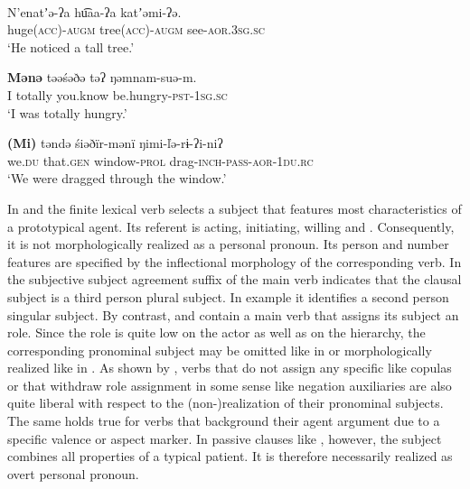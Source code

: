 \documentclass[output=paper]{LSP/langsci}
\begin{document}
\ea \label{12-wr-ex:5}
\\

\ea \label{12-wr-ex:5a}
\gll N’enatʼə-ʔa hu͡aa-ʔa katʼəmi-ʔə.\\
 huge\textsc{(acc)}-\textsc{augm} tree\textsc{(acc)}-\textsc{augm} see-\textsc{aor.3sg.sc}\\
\glt ‘He noticed a tall tree.’

\ex \label{12-wr-ex:5b}
\gll \textbf{Mənə} təəśəðə	təʔ               ŋəmnam-suə-m.\\
I         totally	you.know  be.hungry-\textsc{pst-1sg.sc}\\
\glt ‘I was totally hungry.’

\ex \label{12-wr-ex:5c}%
\gll *\textbf{(Mi)}   təndə       śiəðïr-mənï        ŋimi-ľə-rɨ-ʔi-niʔ\\
we.\textsc{du} that.\textsc{gen} window-\textsc{prol} drag-\textsc{inch-pass-aor-1du.rc}\\
\glt  ‘We were dragged through the window.’
\z
\z

In  and  the finite lexical verb selects a subject that features most characteristics of a prototypical agent. Its referent is acting, initiating, willing and . Consequently, it is not morphologically realized as a personal pronoun. Its person and number features are specified by the inflectional morphology of the corresponding verb. In  the subjective subject agreement suffix of the main verb indicates that the clausal subject is a third person plural subject. In example  it identifies a second person singular subject. By contrast,  and  contain a main verb that assigns its subject an  role. Since the  role is quite low on the actor as well as on the  hierarchy, the corresponding pronominal subject may be omitted like in  or morphologically realized like in . As shown by \citet[257--261]{Wratil2013Distribution}, verbs that do not assign any specific  like copulas or that withdraw role assignment in some sense like negation auxiliaries are also quite liberal with respect to the (non-)realization of their pronominal subjects. The same holds true for verbs that background their agent argument due to a specific valence or aspect marker. In passive clauses like , however, the subject combines all properties of a typical patient. It is therefore necessarily realized as overt personal pronoun. 
\end{document}
